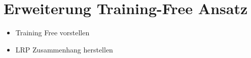 \section{Erweiterung Training-Free Ansatz}
\begin{itemize}
\item Training Free vorstellen
\item LRP Zusammenhang herstellen
\end{itemize}